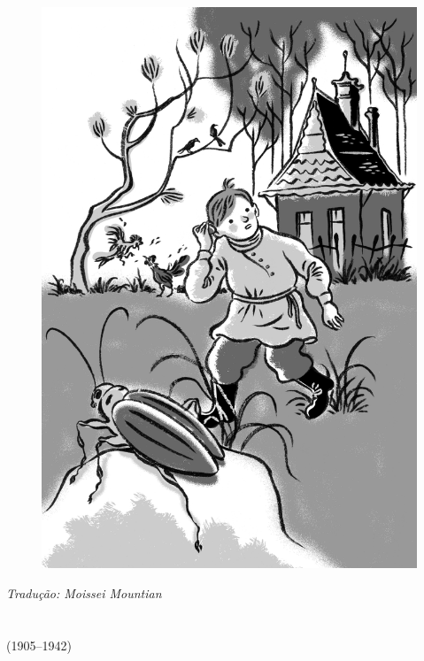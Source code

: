 \begin{figure}%
\vspace*{-2cm}
\hspace*{-2.3cm}\includegraphics{./imgs/cena14.jpg}
\end{figure}

\medskip

{\footnotesize\hfill\emph{Tradução: Moissei Mountian}}


\chapter*{}
\label{part15}
\thispagestyle{empty}

\begin{vplace}[1.5]
{\HUGES\hfill{}}

{\LARGE\hfill\textlt(1905–1942)}
\end{vplace}

